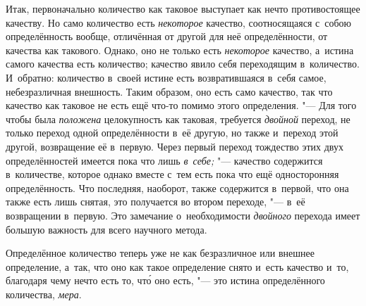 Итак, первоначально количество как таковое выступает как нечто противостоящее
качеству. Но само количество есть {\em некоторое} качество, соотносящаяся
с~собою определённость вообще, отличённая от другой для неё определённости,
от качества как такового. Однако, оно не только есть {\em некоторое} качество,
а~истина самого качества есть количество; качество явило себя переходящим
в~количество. И~обратно: количество в~своей истине есть возвратившаяся в~себя
самое, небезразличная внешность. Таким образом, оно есть само качество, так что
качество как таковое не есть ещё что-то помимо этого определения. "--- Для того
чтобы была {\em положена} целокупность как таковая, требуется {\em двойной}
переход, не только переход одной определённости в~её другую, но также и~переход
этой другой, возвращение её в~первую. Через первый переход тождество этих двух
определённостей имеется пока что лишь {\em в~себе;} "--- качество содержится
в~количестве, которое однако вместе с~тем есть пока что ещё односторонняя
определённость. Что последняя, наоборот, также содержится в~первой, что она
также есть лишь снятая, это получается во втором переходе, "--- в~её
возвращении в~первую. Это замечание о~необходимости {\em двойного} перехода
имеет большую важность для всего научного метода.

Определённое количество теперь уже не как безразличное или внешнее определение,
а~так, что оно как такое определение снято и~есть качество и~то, благодаря чему
нечто есть то, чт\'{о} оно есть, "--- это истина определённого количества,
{\em мера}.

\subremark{}

